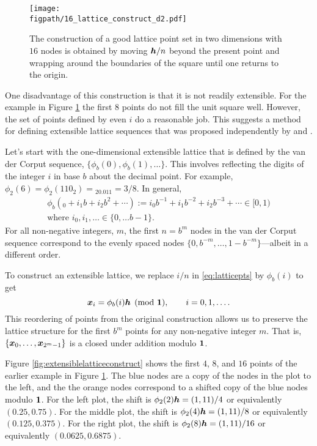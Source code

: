 \documentclass{svproc}
\newcommand{\figpath}{Figures}
\begin{document}
\begin{figure}
	\centering
	\texttt{[image: \\figpath/16\_lattice\_construct\_d2.pdf]}
	\caption{The construction of a good lattice point set in two dimensions with $16$ nodes is obtained by moving ${\boldsymbol{h}}/n$ beyond the present point and wrapping around the boundaries of the square until one returns to the origin. \label{fig:latticeconstruct}}
\end{figure}


One disadvantage of this construction is that it is not readily extensible. For the example in Figure \ref{fig:latticeconstruct} the first $8$ points do not fill the unit square well.  However, the set of points defined by even $i$ do a reasonable job.  This suggests a method for defining extensible lattice sequences that was proposed independently by \cite{Mai81a} and \cite{HicEtal00}.

Let's start with the one-dimensional extensible lattice that is defined by the van der Corput sequence, $\{\phi_b(0), \phi_b(1), \ldots\}$.  This involves reflecting the digits of the integer $i$ in base $b$ about the decimal point.  For example, $\phi_2(6) = \phi_2(110_{2}) = {}_20.011 = 3/8$.  In general,
\begin{multline} \label{eq:vdc}
	\phi_b(_0 + i_1b + i_2 b^2 + \cdots ) := i_0 b^{-1} + i_1 b^{-2} + i_2 b^{-3} + \cdots \in [0,1)
	\\
	 \text{where } i_0, i_1, \ldots \in \{0,\ldots b-1\}.
\end{multline}
For all non-negative integers, $m$, the first $n = b^m$ nodes in the van der Corput sequence correspond to the evenly spaced nodes $\{0, b^{-m}, \ldots, 1 - b^{-m} \}$---albeit in a different order.

To construct an extensible lattice, we replace $i/n$ in \eqref{eq:latticepts} by $\phi_b(i)$ to get
\begin{equation} \label{eq:extensiblelattice}
	{\boldsymbol{x}}_i =\phi_b( i){\boldsymbol{h}} \pmod {{\boldsymbol{1}}}, \qquad i = 0, 1 , \ldots.
\end{equation}
This reordering of points from the original construction allows us to preserve the lattice structure for the first $b^m$ points for any non-negative integer $m$. That is, $\{{\boldsymbol{x}}_0, \ldots, {\boldsymbol{x}}_{2^m-1}\}$ is a closed under addition modulo ${\boldsymbol{1}}$.

Figure \ref{fig:extensiblelatticeconstruct} shows the first $4$, $8$, and $16$ points of the earlier example in Figure \ref{fig:latticeconstruct}.  The blue nodes are a copy of the nodes in the plot to the left, and the the orange nodes correspond to a shifted copy of the blue nodes modulo ${\boldsymbol{1}}$.  For the left plot, the shift is $\phi_2(2){\boldsymbol{h}} = (1,11)/4$ or equivalently $(0.25,0.75)$.  For the middle plot, the shift is $\phi_2(4){\boldsymbol{h}} = (1,11)/8$ or equivalently $(0.125,0.375)$. For the right plot, the shift is $\phi_2(8){\boldsymbol{h}} = (1,11)/16$  or equivalently $(0.0625,0.6875)$.
\end{document}
